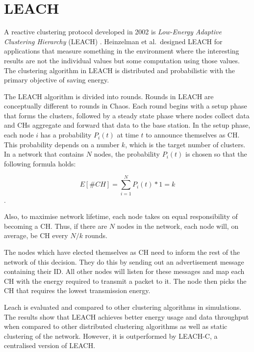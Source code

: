 \section{LEACH}
A reactive clustering protocol developed in 2002 is \textit{Low-Energy Adaptive Clustering Hierarchy} (LEACH) \cite{Heinzelman2002-leach}. Heinzelman et al.~designed LEACH for applications that measure something in the environment where the interesting results are not the individual values but some computation using those values. The clustering algorithm in LEACH is distributed and probabilistic with the primary objective of saving energy.

The LEACH algorithm is divided into rounds. Rounds in LEACH are conceptually different to rounds in Chaos. Each round begins with a setup phase that forms the clusters, followed by a steady state phase where nodes collect data and CHs aggregate and forward that data to the base station. In the setup phase, each node $i$ has a probability $P_i(t)$ at time $t$ to announce themselves as CH. This probability depends on a number $k$, which is the target number of clusters. In a network that contains $N$ nodes, the probability $P_i(t)$ is chosen so that the following formula holds:

$$E[\#CH] = \sum_{i=1}^N P_i(t) * 1 = k$$.

Also, to maximise network lifetime, each node takes on equal responsibility of becoming a CH. Thus, if there are $N$ nodes in the network, each node will, on average, be CH every $N/k$ rounds.

The nodes which have elected themselves as CH need to inform the rest of the network of this decision. They do this by sending out an advertisement message containing their ID. All other nodes will listen for these messages and map each CH with the energy required to transmit a packet to it. The node then picks the CH that requires the lowest transmission energy.

Leach is evaluated and compared to other clustering algorithms in simulations. The results show that LEACH achieves better energy usage and data throughput when compared to other distributed clustering algorithms as well as static clustering of the network. However, it is outperformed by LEACH-C, a centralised version of LEACH.

